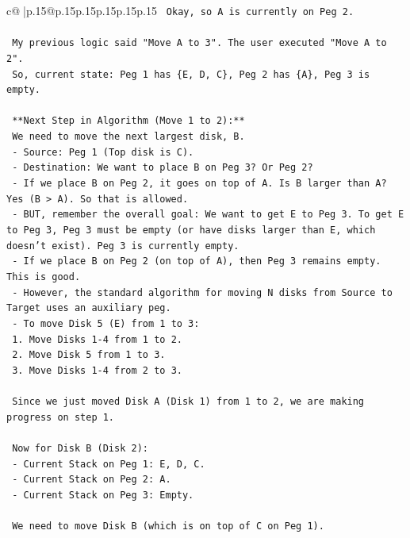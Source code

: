 \documentclass{article}
\begin{document}
{\begin{supertabular}{c@{$\;$}|p{.15\linewidth}@{}p{.15\linewidth}p{.15\linewidth}p{.15\linewidth}p{.15\linewidth}p{.15\linewidth}}
{{{\texttt{  Okay, so A is currently on Peg 2.} \\
\\ 
\texttt{  My previous logic said "Move A to 3". The user executed "Move A to 2".} \\
\texttt{  So, current state: Peg 1 has \{E, D, C\}, Peg 2 has \{A\}, Peg 3 is empty.} \\
\\ 
\texttt{  **Next Step in Algorithm (Move 1 to 2):**} \\
\texttt{  We need to move the next largest disk, B.} \\
\texttt{  {-} Source: Peg 1 (Top disk is C).} \\
\texttt{  {-} Destination: We want to place B on Peg 3? Or Peg 2?} \\
\texttt{    {-} If we place B on Peg 2, it goes on top of A. Is B larger than A? Yes (B > A). So that is allowed.} \\
\texttt{    {-} BUT, remember the overall goal: We want to get E to Peg 3. To get E to Peg 3, Peg 3 must be empty (or have disks larger than E, which doesn't exist). Peg 3 is currently empty.} \\
\texttt{    {-} If we place B on Peg 2 (on top of A), then Peg 3 remains empty. This is good.} \\
\texttt{    {-} However, the standard algorithm for moving N disks from Source to Target uses an auxiliary peg.} \\
\texttt{      {-} To move Disk 5 (E) from 1 to 3:} \\
\texttt{        1. Move Disks 1{-}4 from 1 to 2.} \\
\texttt{        2. Move Disk 5 from 1 to 3.} \\
\texttt{        3. Move Disks 1{-}4 from 2 to 3.} \\
\\ 
\texttt{  Since we just moved Disk A (Disk 1) from 1 to 2, we are making progress on step 1.} \\
\\ 
\texttt{  Now for Disk B (Disk 2):} \\
\texttt{  {-} Current Stack on Peg 1: E, D, C.} \\
\texttt{  {-} Current Stack on Peg 2: A.} \\
\texttt{  {-} Current Stack on Peg 3: Empty.} \\
\\ 
\texttt{  We need to move Disk B (which is on top of C on Peg 1).} \\
}}}
\end{supertabular}}
\end{document}
